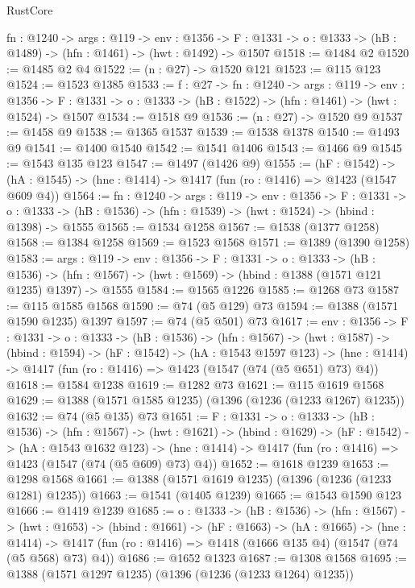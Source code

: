 \begin{lexlean}{RustCore}
\begin{coremodule}
  {fn : @1240} ->
  {args : @119} ->
  {env : @1356} ->
  {F : @1331} -> {o : @1333} -> (hB : @1489) -> (hfn : @1461) -> (hwt : @1492) -> @1507
@1518 := @1484 @2
@1520 := @1485 @2 @4
@1522 := (n : @27) -> @1520 @121
@1523 := @115 @123
@1524 := @1523 @1385
@1533 := {f : @27} ->
  {fn : @1240} ->
  {args : @119} ->
  {env : @1356} ->
  {F : @1331} -> {o : @1333} -> (hB : @1522) -> (hfn : @1461) -> (hwt : @1524) -> @1507
@1534 := @1518 @9
@1536 := (n : @27) -> @1520 @9
@1537 := @1458 @9
@1538 := @1365 @1537
@1539 := @1538 @1378
@1540 := @1493 @9
@1541 := @1400 @1540
@1542 := @1541 @1406
@1543 := @1466 @9
@1545 := @1543 @135 @123
@1547 := @1497 (@1426 @9)
@1555 := (hF : @1542) ->
  (hA : @1545) -> (hne : @1414) -> @1417 (fun (ro : @1416) => @1423 (@1547 @609 @4))
@1564 := {fn : @1240} ->
  {args : @119} ->
  {env : @1356} ->
  {F : @1331} ->
  {o : @1333} -> (hB : @1536) -> (hfn : @1539) -> (hwt : @1524) -> (hbind : @1398) -> @1555
@1565 := @1534 @1258
@1567 := @1538 (@1377 @1258)
@1568 := @1384 @1258
@1569 := @1523 @1568
@1571 := @1389 (@1390 @1258)
@1583 := {args : @119} ->
  {env : @1356} ->
  {F : @1331} ->
  {o : @1333} ->
  (hB : @1536) ->
  (hfn : @1567) -> (hwt : @1569) -> (hbind : @1388 (@1571 @121 @1235) @1397) -> @1555
@1584 := @1565 @1226
@1585 := @1268 @73
@1587 := @115 @1585 @1568
@1590 := @74 (@5 @129) @73
@1594 := @1388 (@1571 @1590 @1235) @1397
@1597 := @74 (@5 @501) @73
@1617 := {env : @1356} ->
  {F : @1331} ->
  {o : @1333} ->
  (hB : @1536) ->
  (hfn : @1567) ->
  (hwt : @1587) ->
  (hbind : @1594) ->
  (hF : @1542) ->
  (hA : @1543 @1597 @123) ->
  (hne : @1414) -> @1417 (fun (ro : @1416) => @1423 (@1547 (@74 (@5 @651) @73) @4))
@1618 := @1584 @1238
@1619 := @1282 @73
@1621 := @115 @1619 @1568
@1629 := @1388 (@1571 @1585 @1235) (@1396 (@1236 (@1233 @1267) @1235))
@1632 := @74 (@5 @135) @73
@1651 := {F : @1331} ->
  {o : @1333} ->
  (hB : @1536) ->
  (hfn : @1567) ->
  (hwt : @1621) ->
  (hbind : @1629) ->
  (hF : @1542) ->
  (hA : @1543 @1632 @123) ->
  (hne : @1414) -> @1417 (fun (ro : @1416) => @1423 (@1547 (@74 (@5 @609) @73) @4))
@1652 := @1618 @1239
@1653 := @1298 @1568
@1661 := @1388 (@1571 @1619 @1235) (@1396 (@1236 (@1233 @1281) @1235))
@1663 := @1541 (@1405 @1239)
@1665 := @1543 @1590 @123
@1666 := @1419 @1239
@1685 := {o : @1333} ->
  (hB : @1536) ->
  (hfn : @1567) ->
  (hwt : @1653) ->
  (hbind : @1661) ->
  (hF : @1663) ->
  (hA : @1665) ->
  (hne : @1414) -> @1417 (fun (ro : @1416) => @1418 (@1666 @135 @4) (@1547 (@74 (@5 @568) @73) @4))
@1686 := @1652 @1323
@1687 := @1308 @1568
@1695 := @1388 (@1571 @1297 @1235) (@1396 (@1236 (@1233 @1264) @1235))

\end{coremodule}
\end{lexlean}
